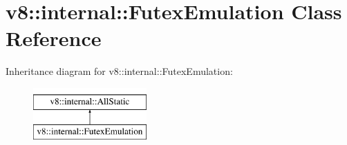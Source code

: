 \hypertarget{classv8_1_1internal_1_1FutexEmulation}{}\section{v8\+:\+:internal\+:\+:Futex\+Emulation Class Reference}
\label{classv8_1_1internal_1_1FutexEmulation}
Inheritance diagram for v8\+:\+:internal\+:\+:Futex\+Emulation\+:\begin{figure}[H]
\begin{center}
\leavevmode
\includegraphics[height=2.000000cm]{classv8_1_1internal_1_1FutexEmulation}
\end{center}
\end{figure}
